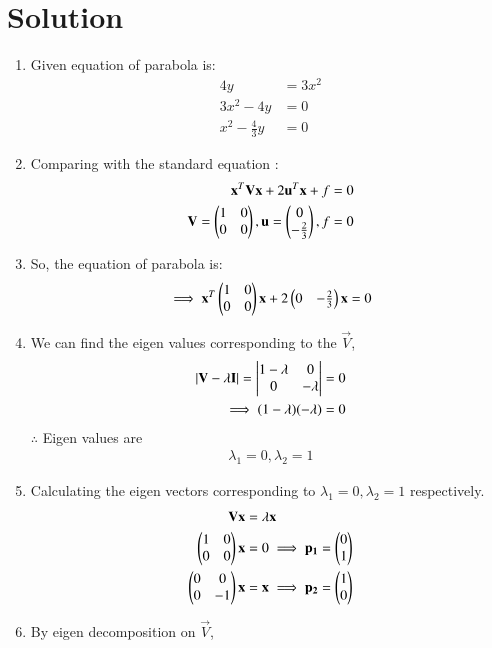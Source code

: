 \documentclass[journal,12pt,twocolumn]{IEEEtran}
\begin{document}
\section{Solution}
\begin{enumerate}
\item Given equation of parabola is:
\begin{align}
 4y&=3x^2
 \\
 3x^2-4y&=0
 \\
 x^2-\frac{4}{3}y&=0
\end{align}
\item Comparing with the standard equation :
\begin{align}
\mathbf{x}^T\mathbf{V}\mathbf{x}+2\mathbf{u}^T\mathbf{x}+f=0 
\\
\mathbf{V}=\begin{pmatrix}1&0\\0&0\end{pmatrix},\mathbf{u}=\begin{pmatrix}0\\-\frac{2}{3}\end{pmatrix},f=0 
\end{align}
\item So, the equation of parabola is:
\begin{align}
\implies \mathbf{x}^T\begin{pmatrix}1&0\\0&0\end{pmatrix}\mathbf{x}+2\begin{pmatrix}0&-\frac{2}{3}\end{pmatrix}\mathbf{x}=0 \label{eq1} 
\end{align}
\item We can find the eigen values corresponding to the $\vec{V}$,
\begin{align}
\lvert\mathbf{V} - \lambda\mathbf{I}\vert = \begin{vmatrix}1-\lambda & 0 \\ 0 & -\lambda\end{vmatrix} &= 0
\\
\implies (1- \lambda)(-\lambda) &= 0
\end{align}
$\therefore$ Eigen values are 
\begin{align}
\lambda_1 = 0 , \lambda_2 = 1
\end{align}
\item Calculating the eigen vectors corresponding to $\lambda_1 = 0 , \lambda_2 = 1$ respectively.
\begin{align}
\mathbf{V}\mathbf{x} &= \lambda\mathbf{x}
\\
\begin{pmatrix}1 & 0 \\ 0 & 0\end{pmatrix}\mathbf{x} &=0 \implies \mathbf{p_1} = \begin{pmatrix}0 \\ 1\end{pmatrix}
\\
\begin{pmatrix}0 & 0 \\ 0 & -1\end{pmatrix}\mathbf{x} &=\mathbf{x}  \implies \mathbf{p_2} = \begin{pmatrix}1 \\ 0\end{pmatrix}
\end{align}
\item By eigen decomposition on $\vec{V}$,

\end{enumerate}
\end{document}
